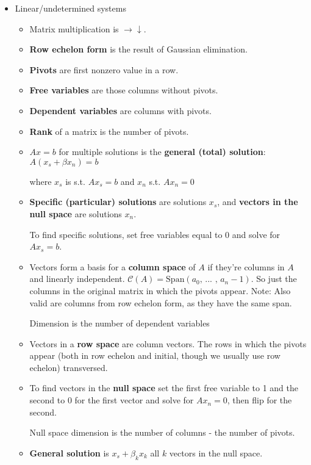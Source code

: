 \documentclass[a4paper]{article}
\begin{document}
    \begin{itemize}
        \item Linear/undetermined systems
        \begin{itemize}
            \item Matrix multiplication is \(\rightarrow \downarrow\).
            \item \textbf{Row echelon form} is the result of Gaussian elimination.
            \item \textbf{Pivots} are first nonzero value in a row.
            \item \textbf{Free variables} are those columns without pivots.
            \item \textbf{Dependent variables} are columns with pivots.
            \item \textbf{Rank} of a matrix is the number of pivots.
            \item \(Ax=b\) for multiple solutions is the \textbf{general (total) solution}: \(A(x_s+\beta x_n)=b\)
            
            where \(x_s\) is s.t. \(Ax_s=b\) and \(x_n\) s.t. \(Ax_n=0\)
            \item \textbf{Specific (particular) solutions} are solutions \(x_s\), and \textbf{vectors in the null space} are solutions \(x_n\).
            
            To find specific solutions, set free variables equal to 0 and solve for \(Ax_s=b\).
            \item Vectors form a basis for a \textbf{column space} of \(A\) if they're columns in \(A\) and linearly independent. \(\mathcal{C}(A)=\text{Span}(a_0\text{, ... , }a_n-1)\). So just the columns in the original matrix in which the pivots appear. Note: Also valid are columns from row echelon form, as they have the same span.
            
            Dimension is the number of dependent variables
            \item Vectors in a \textbf{row space} are column vectors. The rows in which the pivots appear (both in row echelon and initial, though we usually use row echelon) transversed.
            \item To find vectors in the \textbf{null space} set the first free variable to 1 and the second to 0 for the first vector and solve for \(Ax_n=0\), then flip for the second.
            
            Null space dimension is the number of columns - the number of pivots.
            \item \textbf{General solution} is \(x_s +\beta _kx_k\) all \(k\) vectors in the null space.
        \end{itemize}
        

\end{itemize}
\end{document}
